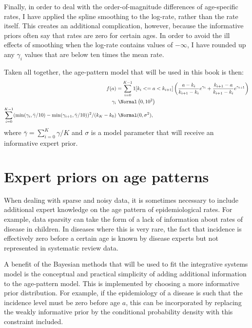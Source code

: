 Finally, in order to deal with the order-of-magnitude differences of
age-specific rates, I have applied the spline smoothing to the
log-rate, rather than the rate itself.  This creates an additional
complication, however, because the informative priors often say that
rates are zero for certain ages.  In order to avoid the ill effects of
smoothing when the log-rate contains values of $-\infty$, I have
rounded up any $\gamma_i$ values that are below ten times the mean
rate.


Taken all together, the age-pattern model that will be used in this
book is then:
\begin{align*}
f(a) &= \sum_{i=0}^{K-1} 1[k_i <= a < k_{i+1}]\left( \frac{a-k_i}{k_{i+1}-k_i} e^{\gamma_i} + \frac{k_{i+1}-a}{k_{i+1}-k_i} e^{\gamma_{i+1}}\right)\\
\gamma_i &~ \Normal\left(0, 10^2\right)\\
\sum_{i=0}^{K-1}(\min(\gamma_i, \bar\gamma/10) - \min(\gamma_{i+1}, \bar\gamma/10))^2/(k_K-k_0) &~ \Normal(0, \sigma^2),\\
\end{align*} 
where $\bar\gamma = \sum_{i=0}^K \gamma/K$ and $\sigma$ is a model parameter that will receive an informative expert prior.




\section{Expert priors on age patterns}

When dealing with sparse and noisy data, it is sometimes necessary to
include additional expert knowledge on the age pattern of
epidemiological rates.  For example, data sparsity can take the form
of a lack of information about rates of disease in children.  In
diseases where this is very rare, the fact that incidence is
effectively zero before a certain age is known by disease experts but
not represented in systematic review data.

A benefit of the Bayesian methods that will be used to fit the
integrative systems model is the conceptual and practical simplicity
of adding additional information to the age-pattern model.  This is
implemented by choosing a more informative prior distribution.  For
example, if the epidemiology of a disease is such that the incidence
level must be zero before age $a$, this can be incorporated by
replacing the weakly informative prior by the conditional probability
density with this constraint included.


